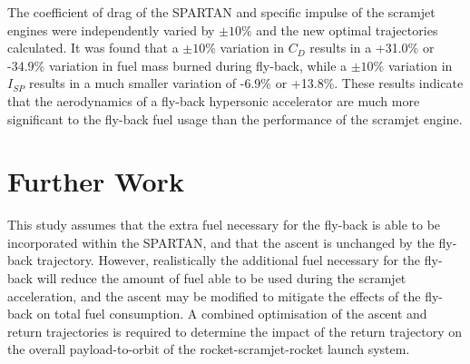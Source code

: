 \documentclass[journal]{new-aiaa} %
\begin{document}
The coefficient of drag of the SPARTAN and specific impulse of the scramjet engines were independently varied by $\pm10\%$ and the new optimal trajectories calculated. It was found that a $\pm10\%$ variation in $C_D$ results in a +31.0\% or -34.9\% variation in fuel mass burned during fly-back, while a $\pm10\%$ variation in $I_{SP}$ results in a much smaller variation of -6.9\% or +13.8\%. These results indicate that the aerodynamics of a fly-back hypersonic accelerator are much more significant to the fly-back fuel usage than the performance of the scramjet engine. 

\section{Further Work}
This study assumes that the extra fuel necessary for the fly-back is able to be incorporated within the SPARTAN, and that the ascent is unchanged by the fly-back trajectory. However, realistically the additional fuel necessary for the fly-back will reduce the amount of fuel able to be used during the scramjet acceleration, and the ascent may be modified to mitigate the effects of the fly-back on total fuel consumption. A combined optimisation of the ascent and return trajectories is required to determine the impact of the return trajectory on the overall payload-to-orbit of the rocket-scramjet-rocket launch system. 


\end{document}
